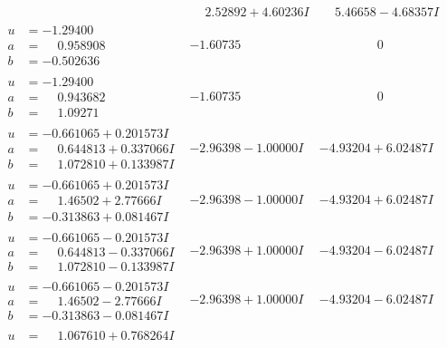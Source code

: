 \documentclass[1p]{elsarticle_modified}
\theoremstyle{definition}
\begin{document}
$$\begin{array}{c|c|c}
 & \phantom{-}2.52892 + 4.60236 I & \phantom{-}5.46658 - 4.68357 I \\ \hline\begin{aligned}
u &= -1.29400\phantom{ +0.000000I} \\
a &= \phantom{-}0.958908\phantom{ +0.000000I} \\
b &= -0.502636\phantom{ +0.000000I}\end{aligned}
 & -1.60735\phantom{ +0.000000I} & \phantom{-0.000000 } 0 \\ \hline\begin{aligned}
u &= -1.29400\phantom{ +0.000000I} \\
a &= \phantom{-}0.943682\phantom{ +0.000000I} \\
b &= \phantom{-}1.09271\phantom{ +0.000000I}\end{aligned}
 & -1.60735\phantom{ +0.000000I} & \phantom{-0.000000 } 0 \\ \hline\begin{aligned}
u &= -0.661065 + 0.201573 I \\
a &= \phantom{-}0.644813 + 0.337066 I \\
b &= \phantom{-}1.072810 + 0.133987 I\end{aligned}
 & -2.96398 - 1.00000 I & -4.93204 + 6.02487 I \\ \hline\begin{aligned}
u &= -0.661065 + 0.201573 I \\
a &= \phantom{-}1.46502 + 2.77666 I \\
b &= -0.313863 + 0.081467 I\end{aligned}
 & -2.96398 - 1.00000 I & -4.93204 + 6.02487 I \\ \hline\begin{aligned}
u &= -0.661065 - 0.201573 I \\
a &= \phantom{-}0.644813 - 0.337066 I \\
b &= \phantom{-}1.072810 - 0.133987 I\end{aligned}
 & -2.96398 + 1.00000 I & -4.93204 - 6.02487 I \\ \hline\begin{aligned}
u &= -0.661065 - 0.201573 I \\
a &= \phantom{-}1.46502 - 2.77666 I \\
b &= -0.313863 - 0.081467 I\end{aligned}
 & -2.96398 + 1.00000 I & -4.93204 - 6.02487 I \\ \hline\begin{aligned}
u &= \phantom{-}1.067610 + 0.768264 I \\

\end{aligned}
\end{array}$$
\end{document}
